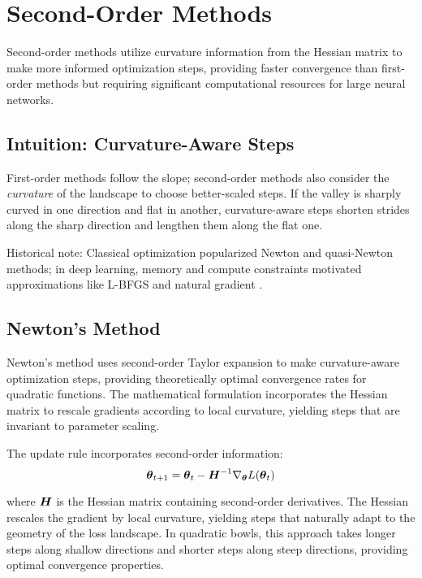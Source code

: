 
\section{Second-Order Methods }
\label{sec:second-order}

Second-order methods utilize curvature information from the Hessian matrix to make more informed optimization steps, providing faster convergence than first-order methods but requiring significant computational resources for large neural networks.

\subsection{Intuition: Curvature-Aware Steps}

First-order methods follow the slope; second-order methods also consider the \textit{curvature} of the landscape to choose better-scaled steps. If the valley is sharply curved in one direction and flat in another, curvature-aware steps shorten strides along the sharp direction and lengthen them along the flat one.

Historical note: Classical optimization popularized Newton and quasi-Newton methods; in deep learning, memory and compute constraints motivated approximations like L-BFGS and natural gradient \cite{LiuNocedal1989,Amari1998,GoodfellowEtAl2016,Bishop2006}.

\subsection{Newton's Method}

Newton's method uses second-order Taylor expansion to make curvature-aware optimization steps, providing theoretically optimal convergence rates for quadratic functions. The mathematical formulation incorporates the Hessian matrix to rescale gradients according to local curvature, yielding steps that are invariant to parameter scaling.

The update rule incorporates second-order information:
\begin{equation}
\boldsymbol{\theta}_{t+1} = \boldsymbol{\theta}_t - \boldsymbol{H}^{-1} \nabla_{\boldsymbol{\theta}} L(\boldsymbol{\theta}_t)
\end{equation}

where $\boldsymbol{H}$ is the Hessian matrix containing second-order derivatives. The Hessian rescales the gradient by local curvature, yielding steps that naturally adapt to the geometry of the loss landscape. In quadratic bowls, this approach takes longer steps along shallow directions and shorter steps along steep directions, providing optimal convergence properties.

